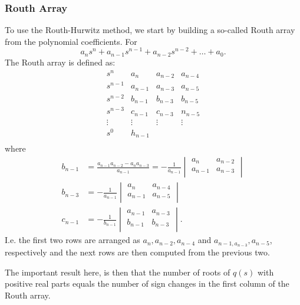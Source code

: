 \subsubsection{Routh Array}
To use the Routh-Hurwitz method, we start by building a so-called Routh array from the polynomial coefficients.
For
\begin{equation*}
  a_n s^{n} + a_{n-1} s^{n-1} + a_{n-2} s^{n-2} + \ldots  + a_0
.\end{equation*}
The Routh array is defined as:
\begin{equation*}
  \begin{array}{c|ccccc}
    s^{n} & a_n & a_{n-2} & a_{n-4}\\
  s^{n-1} & a_{n-1} & a_{n-3} & a_{n-5}\\
  s^{n-2} & b_{n-1} & b_{n-3} &b_{n-5} \\
  s^{n-3} & c_{n-1} & c_{n-3} & n_{n-5}\\
  \vdots  & \vdots  & \vdots  & \vdots \\
  s^{0} & h_{n-1} &  & \\
  \end{array}
\end{equation*}
where
\begin{align*}
  b_{n-1} &= \frac{a_{n-1} a_{n-2} - a_{n} a_{n-3}}{a_{n-1}} = - \frac{1}{a_{n-1}} \begin{vmatrix}
    a_n & a_{n-2}\\
  a_{n-1} & a_{n-3}\\
  \end{vmatrix} \\
  b_{n-3} &= - \frac{1}{a_{n-1}} \begin{vmatrix}
    a_n & a_{n-4}\\
  a_{n-1} & a_{n-5}\\
  \end{vmatrix} \\
    c_{n-1} &= - \frac{1}{b_{n-1}} \begin{vmatrix}
      a_{n-1} & a_{n-3}\\
    b_{n-1} & b_{n-3}\\
    \end{vmatrix}
.\end{align*}
I.e. the first two rows are arranged as $a_n, a_{n-2}, a_{n-4}$ and $a_{n-1, a_{n-3}}, a_{n-5}$, respectively and the next rows are then computed from the previous two.

The important result here, is then that the number of roots of $q(s)$ with positive real parts equals the number of sign changes in the first column of the Routh array.

